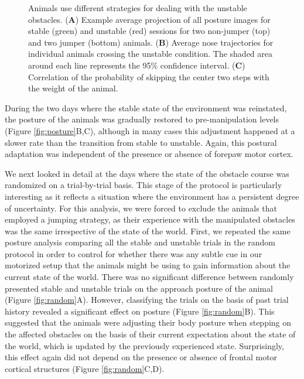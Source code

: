 \begin{figure}
\centering

\caption{Animals use different strategies for dealing with the unstable obstacles. (\textbf{A}) Example average projection of all posture images for stable (green) and unstable (red) sessions for two non-jumper (top) and two jumper (bottom) animals. (\textbf{B}) Average nose trajectories for individual animals crossing the unstable condition. The shaded area around each line represents the 95\% confidence interval. (\textbf{C}) Correlation of the probability of skipping the center two steps with the weight of the animal.}
\label{fig:jumping}
\end{figure}

During the two days where the stable state of the environment was reinstated, the posture of the animals was gradually restored to pre-manipulation levels (Figure \ref{fig:posture}B,C), although in many cases this adjustment happened at a slower rate than the transition from stable to unstable. Again, this postural adaptation was independent of the presence or absence of forepaw motor cortex.

We next looked in detail at the days where the state of the obstacle course was randomized on a trial-by-trial basis. This stage of the protocol is particularly interesting as it reflects a situation where the environment has a persistent degree of uncertainty. For this analysis, we were forced to exclude the animals that employed a jumping strategy, as their experience with the manipulated obstacles was the same irrespective of the state of the world. First, we repeated the same posture analysis comparing all the stable and unstable trials in the random protocol in order to control for whether there was any subtle cue in our motorized setup that the animals might be using to gain information about the current state of the world. There was no significant difference between randomly presented stable and unstable trials on the approach posture of the animal (Figure \ref{fig:random}A). However, classifying the trials on the basis of past trial history revealed a significant effect on posture (Figure \ref{fig:random}B). This suggested that the animals were adjusting their body posture when stepping on the affected obstacles on the basis of their current expectation about the state of the world, which is updated by the previously experienced state. Surprisingly, this effect again did not depend on the presence or absence of frontal motor cortical structures (Figure \ref{fig:random}C,D).

